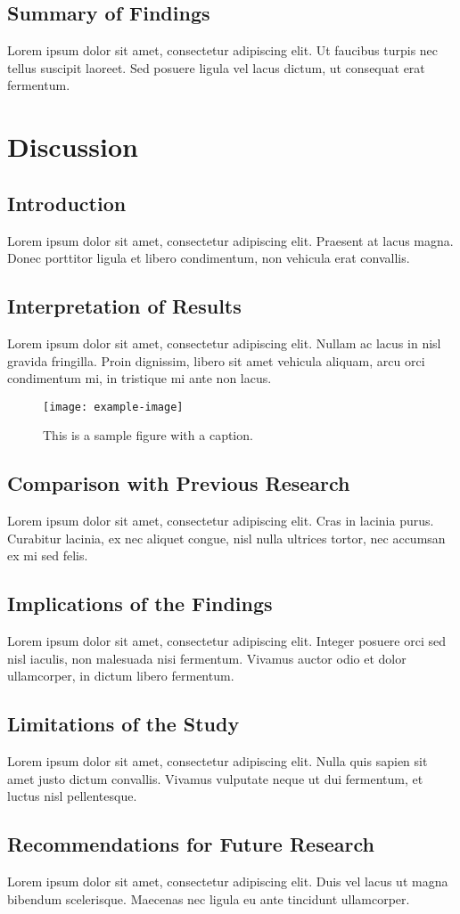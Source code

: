 \subsection{Summary of Findings}
Lorem ipsum dolor sit amet, consectetur adipiscing elit. Ut faucibus turpis nec tellus suscipit laoreet. Sed posuere ligula vel lacus dictum, ut consequat erat fermentum.

\section{Discussion}
\subsection{Introduction}
Lorem ipsum dolor sit amet, consectetur adipiscing elit. Praesent at lacus magna. Donec porttitor ligula et libero condimentum, non vehicula erat convallis.

\subsection{Interpretation of Results}
Lorem ipsum dolor sit amet, consectetur adipiscing elit. Nullam ac lacus in nisl gravida fringilla. Proin dignissim, libero sit amet vehicula aliquam, arcu orci condimentum mi, in tristique mi ante non lacus.
\begin{figure}[ht]
    \centering
    \texttt{[image: example-image]}
    \caption{This is a sample figure with a caption.}
    \label{fig:sample}
\end{figure}
\subsection{Comparison with Previous Research}
Lorem ipsum dolor sit amet, consectetur adipiscing elit. Cras in lacinia purus. Curabitur lacinia, ex nec aliquet congue, nisl nulla ultrices tortor, nec accumsan ex mi sed felis.

\subsection{Implications of the Findings}
Lorem ipsum dolor sit amet, consectetur adipiscing elit. Integer posuere orci sed nisl iaculis, non malesuada nisi fermentum. Vivamus auctor odio et dolor ullamcorper, in dictum libero fermentum.

\subsection{Limitations of the Study}
Lorem ipsum dolor sit amet, consectetur adipiscing elit. Nulla quis sapien sit amet justo dictum convallis. Vivamus vulputate neque ut dui fermentum, et luctus nisl pellentesque.

\subsection{Recommendations for Future Research}
Lorem ipsum dolor sit amet, consectetur adipiscing elit. Duis vel lacus ut magna bibendum scelerisque. Maecenas nec ligula eu ante tincidunt ullamcorper.